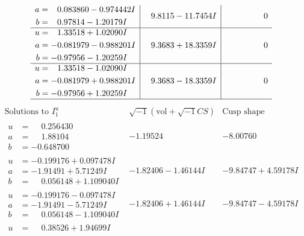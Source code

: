 \documentclass[1p]{elsarticle_modified}
\theoremstyle{definition}
\newcommand{\I}{\sqrt{-1}}
\begin{document}
$$\begin{array}{c|c|c}
\begin{aligned}
a &= \phantom{-}0.083860 - 0.974442 I \\
b &= \phantom{-}0.97814 - 1.20179 I\end{aligned}
 & \phantom{-}9.8115 - 11.7454 I & \phantom{-0.000000 } 0 \\ \hline\begin{aligned}
u &= \phantom{-}1.33518 + 1.02090 I \\
a &= -0.081979 - 0.988201 I \\
b &= -0.97956 - 1.20259 I\end{aligned}
 & \phantom{-}9.3683 + 18.3359 I & \phantom{-0.000000 } 0 \\ \hline\begin{aligned}
u &= \phantom{-}1.33518 - 1.02090 I \\
a &= -0.081979 + 0.988201 I \\
b &= -0.97956 + 1.20259 I\end{aligned}
 & \phantom{-}9.3683 - 18.3359 I & \phantom{-0.000000 } 0\\
 \hline 
 \end{array}$$\newpage$$\begin{array}{c|c|c}  
\text{Solutions to }I^u_{1}& \I (\text{vol} + \sqrt{-1}CS) & \text{Cusp shape}\\
 \hline 
\begin{aligned}
u &= \phantom{-}0.256430\phantom{ +0.000000I} \\
a &= \phantom{-}1.88104\phantom{ +0.000000I} \\
b &= -0.648700\phantom{ +0.000000I}\end{aligned}
 & -1.19524\phantom{ +0.000000I} & -8.00760\phantom{ +0.000000I} \\ \hline\begin{aligned}
u &= -0.199176 + 0.097478 I \\
a &= -1.91491 + 5.71249 I \\
b &= \phantom{-}0.056148 + 1.109040 I\end{aligned}
 & -1.82406 - 1.46144 I & -9.84747 + 4.59178 I \\ \hline\begin{aligned}
u &= -0.199176 - 0.097478 I \\
a &= -1.91491 - 5.71249 I \\
b &= \phantom{-}0.056148 - 1.109040 I\end{aligned}
 & -1.82406 + 1.46144 I & -9.84747 - 4.59178 I \\ \hline\begin{aligned}
u &= \phantom{-}0.38526 + 1.94699 I \\

\end{aligned}
\end{array}$$
\end{document}
